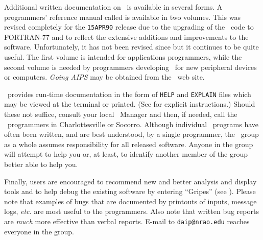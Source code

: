      Additional written documentation on \AIPS\ is available in
several forms.  A programmers' reference manual called {\it
{}\/} is available in two volumes.  This was revised
completely for the {\tt 15APR90} release due to the upgrading of the
\AIPS\ code to FORTRAN-77 and to reflect the extensive additions and
improvements to the software.  Unfortunately, it has not been revised
since but it continues to be quite useful.  The first volume is
intended for applications programmers, while the second volume is
needed by programmers developing \AIPS\ for new peripheral devices or
computers.  {\it Going AIPS\/} may be obtained from the \AIPS\ web
site.

     \AIPS\ provides run-time documentation in the form of {\tt HELP}
and {\tt EXPLAIN} files which may be viewed at the terminal or
printed. (See  for explicit instructions.)  Should these not
suffice, consult your local \AIPS\ Manager and then, if needed, call
the \AIPS\ programmers in Charlottesville or Socorro.  Although
individual \AIPS\ programs have often been written, and are best
understood, by a single programmer, the \AIPS\ group as a whole
assumes responsibility for all released software.  Anyone in the group
will attempt to help you or, at least, to identify another member of
the group better able to help you.

     Finally, users are encouraged to recommend new and better
analysis and display tools and to help debug the existing software by
entering ``Gripes'' (see ).  Please note that examples of
bugs that are documented by printouts of inputs, message logs, {\it
etc.\/} are most useful to the programmers.  Also note that written
bug reports are {\it much\/} more effective than verbal reports.
E-mail to {\tt daip@nrao.edu} reaches everyone in the group.



